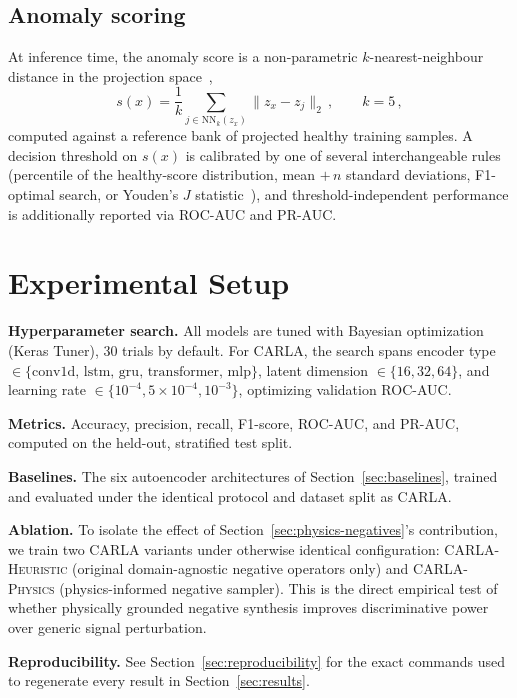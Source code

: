 \documentclass[11pt,a4paper]{article}
\begin{document}
\subsection{Anomaly scoring}
At inference time, the anomaly score is a non-parametric $k$-nearest-neighbour distance
in the projection space~\cite{cover1967knn},
\begin{equation}
s(x) = \frac{1}{k}\sum_{j\in\mathrm{NN}_k(z_x)} \lVert z_x - z_j \rVert_2\,,
\qquad k=5\,,
\label{eq:knn-score}
\end{equation}
computed against a reference bank of projected healthy training samples. A decision
threshold on $s(x)$ is calibrated by one of several interchangeable rules (percentile of
the healthy-score distribution, mean $+\,n$ standard deviations, F1-optimal search, or
Youden's $J$ statistic~\cite{fawcett2006roc}), and threshold-independent performance is
additionally reported via ROC-AUC and PR-AUC.

\section{Experimental Setup}
\label{sec:setup}

\textbf{Hyperparameter search.} All models are tuned with Bayesian optimization
(Keras Tuner), $30$ trials by default. For CARLA, the search spans encoder type
$\in\{\text{conv1d, lstm, gru, transformer, mlp}\}$, latent dimension
$\in\{16,32,64\}$, and learning rate $\in\{10^{-4}, 5\times10^{-4}, 10^{-3}\}$, optimizing
validation ROC-AUC.

\textbf{Metrics.} Accuracy, precision, recall, F1-score, ROC-AUC, and PR-AUC, computed on
the held-out, stratified test split.

\textbf{Baselines.} The six autoencoder architectures of Section~\ref{sec:baselines},
trained and evaluated under the identical protocol and dataset split as CARLA.

\textbf{Ablation.} To isolate the effect of Section~\ref{sec:physics-negatives}'s
contribution, we train two CARLA variants under otherwise identical configuration:
\textsc{CARLA-Heuristic} (original domain-agnostic negative operators only) and
\textsc{CARLA-Physics} (physics-informed negative sampler). This is the direct empirical
test of whether physically grounded negative synthesis improves discriminative power over
generic signal perturbation.

\textbf{Reproducibility.} See Section~\ref{sec:reproducibility} for the exact commands
used to regenerate every result in Section~\ref{sec:results}.
\end{document}
